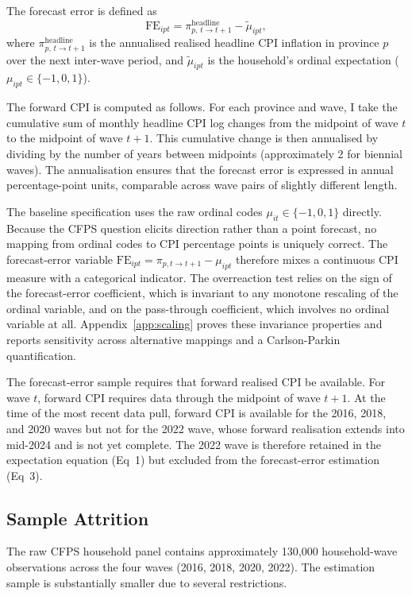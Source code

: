The forecast error is defined as
\[
  \mathrm{FE}_{ipt}
  = \pi^{\text{headline}}_{p,\,t\to t+1}
    - \tilde{\mu}_{ipt},
\]
where $\pi^{\text{headline}}_{p,\,t\to t+1}$ is the
annualised realised headline CPI inflation in province $p$
over the next inter-wave period, and $\tilde{\mu}_{ipt}$ is
the household's ordinal expectation ($\mu_{ipt} \in \{-1,0,1\}$).

The forward CPI is computed as follows.
For each province and wave, I take the cumulative sum of
monthly headline CPI log changes from the midpoint of wave
$t$ to the midpoint of wave $t+1$.
This cumulative change is then annualised by dividing by the
number of years between midpoints (approximately 2 for
biennial waves).
The annualisation ensures that the forecast error is
expressed in annual percentage-point units, comparable across
wave pairs of slightly different length.

The baseline specification uses the raw ordinal codes
$\mu_{it} \in \{-1, 0, 1\}$ directly.
Because the CFPS question elicits direction rather than a
point forecast, no mapping from ordinal codes to CPI
percentage points is uniquely correct.
The forecast-error variable
$\mathrm{FE}_{ipt} = \pi_{p,t\to t+1} - \mu_{ipt}$
therefore mixes a continuous CPI measure with a categorical
indicator.
The overreaction test relies on the sign of the forecast-error
coefficient, which is invariant to any monotone rescaling
of the ordinal variable, and on the pass-through coefficient,
which involves no ordinal variable at all.
Appendix~\ref{app:scaling} proves these invariance properties
and reports sensitivity across alternative mappings and a
Carlson-Parkin quantification.

The forecast-error sample requires that forward realised CPI
be available.
For wave $t$, forward CPI requires data through the midpoint
of wave $t+1$.
At the time of the most recent data pull, forward CPI is
available for the 2016, 2018, and 2020 waves but not for the
2022 wave, whose forward realisation extends into mid-2024
and is not yet complete.
The 2022 wave is therefore retained in the expectation
equation (Eq~1) but excluded from the forecast-error
estimation (Eq~3).

\subsection{Sample Attrition}\label{app:attrition}

The raw CFPS household panel contains approximately 130,000
household-wave observations across the four waves (2016, 2018,
2020, 2022).
The estimation sample is substantially smaller due to several
restrictions.

